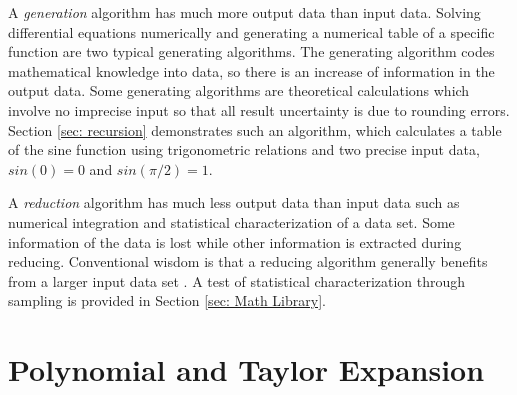 \documentclass[twoside]{article}
\numberwithin{equation}{section}
\begin{document}
A \emph{generation} algorithm has much more output data than input data.  
Solving differential equations numerically and generating a numerical table of a specific function are two typical generating algorithms.  
The generating algorithm codes mathematical knowledge into data, so there is an increase of information in the output data.  
Some generating algorithms are theoretical calculations which involve no imprecise input so that all result uncertainty is due to rounding errors.  
Section \ref{sec: recursion} demonstrates such an algorithm, which calculates a table of the sine function using trigonometric relations and two precise input data, $sin(0)=0$ and $sin(\pi/2)=1$.  

A \emph{reduction} algorithm has much less output data than input data such as numerical integration and statistical characterization of a data set.  
Some information of the data is lost while other information is extracted during reducing.  
Conventional wisdom is that a reducing algorithm generally benefits from a larger input data set \cite{Probability_Statistics}.  
A test of statistical characterization through sampling is provided in Section \ref{sec: Math Library}.



\clearpage
\section{Polynomial and Taylor Expansion}
\label{sec: polynomial}

\iffalse
\end{document}
